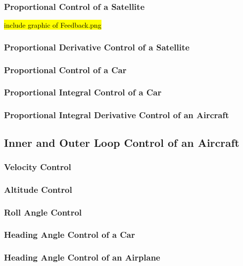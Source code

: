 \subsubsection{Proportional Control of a Satellite}

\hl{include graphic of Feedback.png}

\subsubsection{Proportional Derivative Control of a Satellite}

\subsubsection{Proportional Control of a Car}

\subsubsection{Proportional Integral Control of a Car}

\subsubsection{Proportional Integral Derivative Control of an Aircraft}

\subsection{Inner and Outer Loop Control of an Aircraft}

\subsubsection{Velocity Control}

\subsubsection{Altitude Control}

\subsubsection{Roll Angle Control}

\subsubsection{Heading Angle Control of a Car}

\subsubsection{Heading Angle Control of an Airplane}

